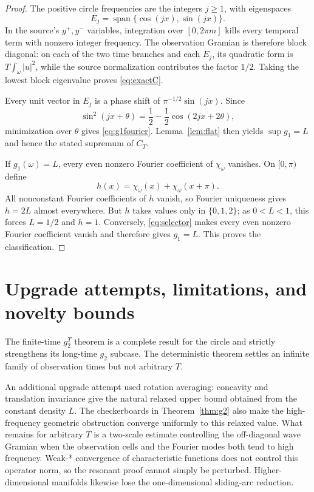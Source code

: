 \documentclass[11pt]{article}
\begin{document}
\begin{proof}
The positive circle frequencies are the integers $j\geq1$, with eigenspaces
\[
 E_j=\operatorname{span}\{\cos(jx),\sin(jx)\}.
\]
In the source's
$y^+,y^-$ variables, integration over $[0,2\pi m]$ kills every temporal term
with nonzero integer frequency.  The observation Gramian is therefore block
diagonal: on each of the two time branches and each $E_j$, its quadratic form
is $T\int_\omega|u|^2$, while the source normalization contributes the factor
$1/2$.  Taking the lowest block eigenvalue proves \eqref{eq:exactC}.

Every unit vector in $E_j$ is a phase shift of
$\pi^{-1/2}\sin(jx)$.  Since
\[
 \sin^2(jx+\theta)=\frac12-\frac12\cos(2jx+2\theta),
\]
minimization over $\theta$ gives \eqref{eq:g1fourier}.  Lemma~\ref{lem:flat}
then yields $\sup g_1=L$ and hence the stated supremum of $C_T$.

If $g_1(\omega)=L$, every even nonzero Fourier coefficient of
$\chi_\omega$ vanishes.  On $[0,\pi)$ define
\[
 h(x)=\chi_\omega(x)+\chi_\omega(x+\pi).
\]
All nonconstant Fourier coefficients of $h$ vanish, so Fourier uniqueness
gives $h=2L$ almost everywhere.  But $h$ takes values only in
$\{0,1,2\}$; as $0<L<1$, this forces $L=1/2$ and $h=1$.  Conversely,
\eqref{eq:selector} makes every even nonzero Fourier coefficient vanish and
therefore gives $g_1=L$.  This proves the classification.
\end{proof}

\section*{Upgrade attempts, limitations, and novelty bounds}

The finite-time $g_2^T$ theorem is a complete result for the circle and
strictly strengthens its long-time $g_2$ subcase.  The deterministic theorem
settles an infinite family of observation times but not arbitrary $T$.

An additional upgrade attempt used rotation averaging: concavity and
translation invariance give the natural relaxed upper bound obtained from the
constant density $L$.  The checkerboards in Theorem~\ref{thm:g2} also make the
high-frequency geometric obstruction converge uniformly to this relaxed
value.  What remains for arbitrary $T$ is a two-scale estimate controlling the
off-diagonal wave Gramian when the observation cells and the Fourier modes
both tend to high frequency.  Weak-* convergence of characteristic functions
does not control this operator norm, so the resonant proof cannot simply be
perturbed.  Higher-dimensional manifolds likewise lose the one-dimensional
sliding-arc reduction.
\end{document}
